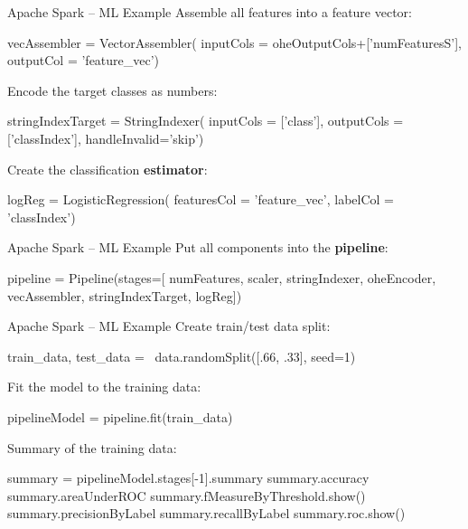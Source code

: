 \documentclass[ignorenonframetext,xcolor=x11names]{beamer}
\begin{document}
\begin{frame}[fragile]{Apache Spark -- ML Example}
Assemble all features into a feature vector:
\begin{pythoncode}
vecAssembler = VectorAssembler(
    inputCols = oheOutputCols+['numFeaturesS'],
    outputCol = 'feature_vec')
\end{pythoncode}
Encode the target classes as numbers:
\begin{pythoncode}
stringIndexTarget = StringIndexer(
    inputCols = ['class'],
    outputCols = ['classIndex'],
    handleInvalid='skip')
\end{pythoncode}    
Create the classification \textbf{estimator}:
\begin{pythoncode}
logReg = LogisticRegression(
    featuresCol = 'feature_vec',
    labelCol = 'classIndex')
\end{pythoncode}
\end{frame}

\begin{frame}[fragile]{Apache Spark -- ML Example}
Put all components into the \textbf{pipeline}:
\begin{pythoncode}
pipeline = Pipeline(stages=[
    numFeatures,
    scaler,
    stringIndexer,
    oheEncoder,
    vecAssembler,
    stringIndexTarget,
    logReg])
\end{pythoncode}
\end{frame}


\begin{frame}[fragile]{Apache Spark -- ML Example}
Create train/test data split:
\begin{pythoncode}
train_data, test_data = \
    data.randomSplit([.66, .33], seed=1)
\end{pythoncode}
Fit the model to the training data:
\begin{pythoncode}
pipelineModel = pipeline.fit(train_data)
\end{pythoncode}
Summary of the training data:
\begin{pythoncode}
summary = pipelineModel.stages[-1].summary
summary.accuracy
summary.areaUnderROC
summary.fMeasureByThreshold.show()
summary.precisionByLabel
summary.recallByLabel
summary.roc.show()
\end{pythoncode}
\end{frame}
\end{document}
